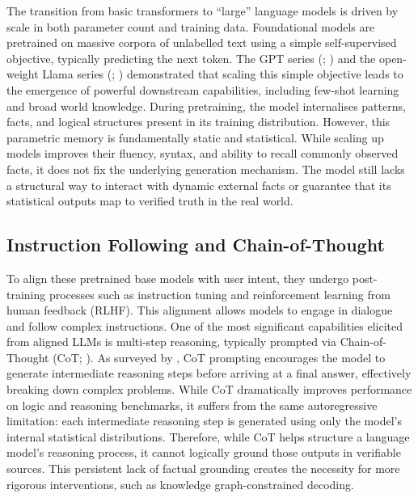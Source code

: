 The transition from basic transformers to ``large'' language models is driven by scale in both parameter count and training data. Foundational models are pretrained on massive corpora of unlabelled text using a simple self-supervised objective, typically predicting the next token. The GPT series (\citealt{brown2020gpt3}; \citealt{achiam2023gpt4}) and the open-weight Llama series (\citealt{touvron2023llama}; \citealt{dubey2024llama3}) demonstrated that scaling this simple objective leads to the emergence of powerful downstream capabilities, including few-shot learning and broad world knowledge. During pretraining, the model internalises patterns, facts, and logical structures present in its training distribution. However, this parametric memory is fundamentally static and statistical. While scaling up models improves their fluency, syntax, and ability to recall commonly observed facts, it does not fix the underlying generation mechanism. The model still lacks a structural way to interact with dynamic external facts or guarantee that its statistical outputs map to verified truth in the real world.

\subsection{Instruction Following and Chain-of-Thought}

To align these pretrained base models with user intent, they undergo post-training processes such as instruction tuning and reinforcement learning from human feedback (RLHF). This alignment allows models to engage in dialogue and follow complex instructions. One of the most significant capabilities elicited from aligned LLMs is multi-step reasoning, typically prompted via Chain-of-Thought (CoT; \citealt{wei2022cot}). As surveyed by \citet{huang2023towards}, CoT prompting encourages the model to generate intermediate reasoning steps before arriving at a final answer, effectively breaking down complex problems. While CoT dramatically improves performance on logic and reasoning benchmarks, it suffers from the same autoregressive limitation: each intermediate reasoning step is generated using only the model's internal statistical distributions. Therefore, while CoT helps structure a language model's reasoning process, it cannot logically ground those outputs in verifiable sources. This persistent lack of factual grounding creates the necessity for more rigorous interventions, such as knowledge graph-constrained decoding.

